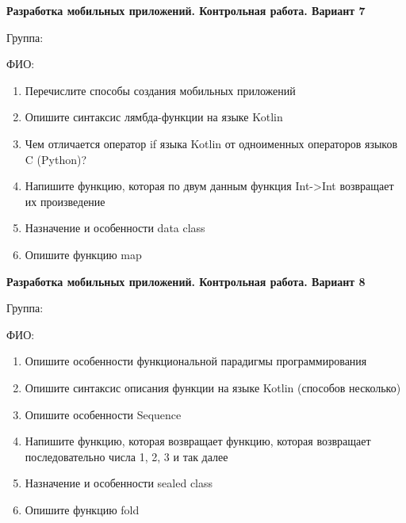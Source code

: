 \documentclass[12pt]{article}
\begin{document}
\newpage\begin{minipage}{\textwidth}
\textbf{Разработка мобильных приложений. Контрольная работа. Вариант 7}

Группа: \underline{\hspace{3cm}}

ФИО: \underline{\hspace{10cm}}

\begin{enumerate}
\item Перечислите способы создания мобильных приложений
\item Опишите синтаксис лямбда-функции на языке Kotlin
\item Чем отличается оператор if языка Kotlin от одноименных операторов языков C (Python)?
\item Напишите функцию, которая по двум данным функция Int->Int возвращает их произведение
\item Назначение и особенности data class
\item Опишите функцию map

\end{enumerate}
\end{minipage}

\newpage\begin{minipage}{\textwidth}
\textbf{Разработка мобильных приложений. Контрольная работа. Вариант 8}

Группа: \underline{\hspace{3cm}}

ФИО: \underline{\hspace{10cm}}

\begin{enumerate}
\item Опишите особенности функциональной парадигмы программирования
\item Опишите синтаксис описания функции на языке Kotlin (способов несколько)
\item Опишите особенности Sequence
\item Напишите функцию, которая возвращает функцию, которая возвращает последовательно числа 1, 2, 3 и так далее
\item Назначение и особенности sealed class
\item Опишите функцию fold

\end{enumerate}
\end{minipage}
\end{document}
